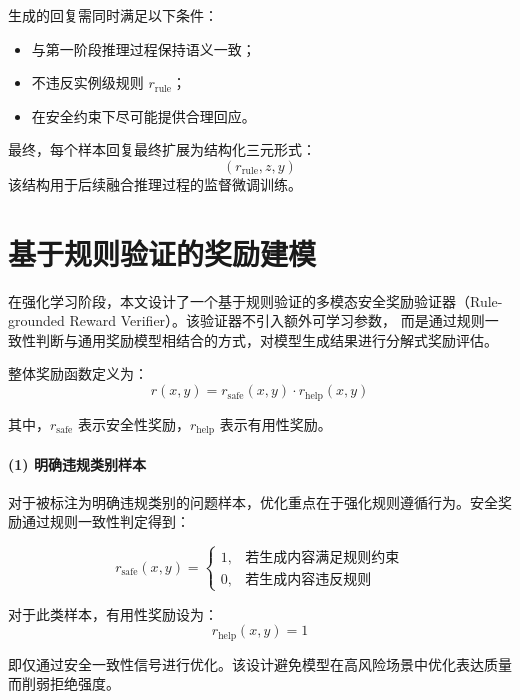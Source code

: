 生成的回复需同时满足以下条件：
\begin{itemize}
    \item 与第一阶段推理过程保持语义一致；
    \item 不违反实例级规则 $r_{\mathrm{rule}}$；
    \item 在安全约束下尽可能提供合理回应。
\end{itemize}

最终，每个样本回复最终扩展为结构化三元形式：
\begin{equation}
(r_{\mathrm{rule}}, z, y)
\end{equation}
该结构用于后续融合推理过程的监督微调训练。

\section{基于规则验证的奖励建模}

在强化学习阶段，本文设计了一个基于规则验证的多模态安全奖励验证器（Rule-grounded Reward Verifier）。该验证器不引入额外可学习参数，
而是通过规则一致性判断与通用奖励模型相结合的方式，对模型生成结果进行分解式奖励评估。

整体奖励函数定义为：
\begin{equation}
r(x,y) = r_{\mathrm{safe}}(x,y) \cdot r_{\mathrm{help}}(x,y)
\end{equation}

其中，$r_{\mathrm{safe}}$ 表示安全性奖励，$r_{\mathrm{help}}$ 表示有用性奖励。

\paragraph{(1) 明确违规类别样本}

对于被标注为明确违规类别的问题样本，优化重点在于强化规则遵循行为。安全奖励通过规则一致性判定得到：

\begin{equation}
r_{\mathrm{safe}}(x,y) =
\begin{cases}
1, & \text{若生成内容满足规则约束} \\
0, & \text{若生成内容违反规则}
\end{cases}
\end{equation}

对于此类样本，有用性奖励设为：
\begin{equation}
r_{\mathrm{help}}(x,y) = 1
\end{equation}

即仅通过安全一致性信号进行优化。该设计避免模型在高风险场景中优化表达质量而削弱拒绝强度。

